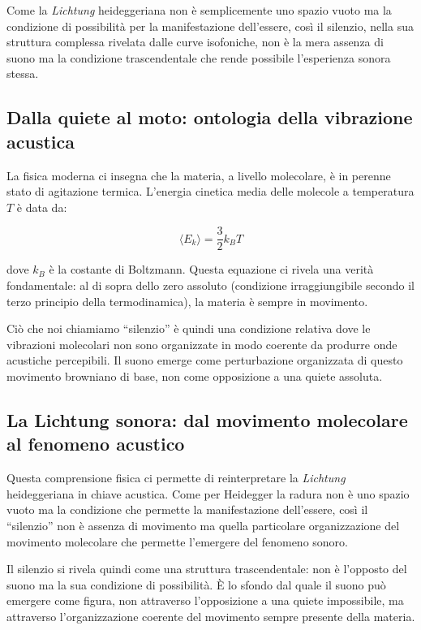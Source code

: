 \documentclass[a4paper,11pt]{article}
\begin{document}
Come la \emph{Lichtung} heideggeriana non è semplicemente uno spazio
vuoto ma la condizione di possibilità per la manifestazione dell'essere,
così il silenzio, nella sua struttura complessa rivelata dalle curve
isofoniche, non è la mera assenza di suono ma la condizione
trascendentale che rende possibile l'esperienza sonora stessa.

\subsection{Dalla quiete al moto: ontologia della vibrazione
acustica}\label{dalla-quiete-al-moto-ontologia-della-vibrazione-acustica}

La fisica moderna ci insegna che la materia, a livello molecolare, è in
perenne stato di agitazione termica. L'energia cinetica media delle
molecole a temperatura \(T\) è data da:

\[\langle E_k \rangle = \frac{3}{2}k_BT\]

dove \(k_B\) è la costante di Boltzmann. Questa equazione ci rivela una
verità fondamentale: al di sopra dello zero assoluto (condizione
irraggiungibile secondo il terzo principio della termodinamica), la
materia è sempre in movimento.

Ciò che noi chiamiamo ``silenzio'' è quindi una condizione relativa dove
le vibrazioni molecolari non sono organizzate in modo coerente da
produrre onde acustiche percepibili. Il suono emerge come perturbazione
organizzata di questo movimento browniano di base, non come opposizione
a una quiete assoluta.

\subsection{La Lichtung sonora: dal movimento molecolare al fenomeno
acustico}\label{la-lichtung-sonora-dal-movimento-molecolare-al-fenomeno-acustico}

Questa comprensione fisica ci permette di reinterpretare la
\emph{Lichtung} heideggeriana in chiave acustica. Come per Heidegger la
radura non è uno spazio vuoto ma la condizione che permette la
manifestazione dell'essere, così il ``silenzio'' non è assenza di
movimento ma quella particolare organizzazione del movimento molecolare
che permette l'emergere del fenomeno sonoro.

Il silenzio si rivela quindi come una struttura trascendentale: non è
l'opposto del suono ma la sua condizione di possibilità. È lo sfondo dal
quale il suono può emergere come figura, non attraverso l'opposizione a
una quiete impossibile, ma attraverso l'organizzazione coerente del
movimento sempre presente della materia.
\end{document}

